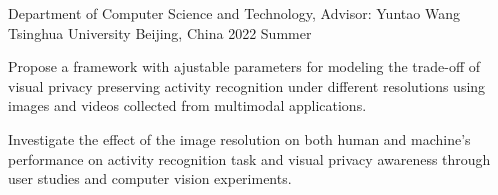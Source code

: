 \begin{cventries}
  \cventry
    {Department of Computer Science and Technology, Advisor: Yuntao Wang} %
    {Tsinghua University} %
    {Beijing, China} %
    {2022 Summer} %
    {
      \begin{cvitems} %
        \item {Propose a framework with ajustable parameters for modeling the trade-off of visual privacy preserving activity recognition under different resolutions using images and videos collected from multimodal applications.}
        \item {Investigate the effect of the image resolution on both human and machine's performance on activity recognition task and visual privacy awareness through user studies and computer vision experiments.}
      \end{cvitems}
    }

\end{cventries}
